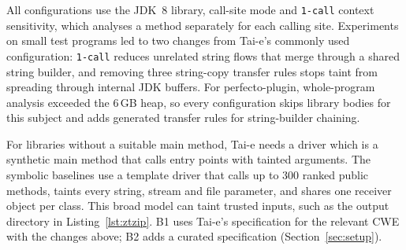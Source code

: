 \documentclass[sigconf]{acmart}
\begin{document}
All configurations use the JDK~8 library, call-site mode and \texttt{1-call} context sensitivity, which analyses a method separately for each calling site. Experiments on small test programs led to two changes from Tai-e's commonly used configuration: \texttt{1-call} reduces unrelated string flows that merge through a shared string builder, and removing three string-copy transfer rules stops taint from spreading through internal JDK buffers. For perfecto-plugin, whole-program analysis exceeded the 6\,GB heap, so every configuration skips library bodies for this subject and adds generated transfer rules for string-builder chaining.

For libraries without a suitable main method, Tai-e needs a driver which is a synthetic main method that calls entry points with tainted arguments. The symbolic baselines use a template driver that calls up to 300 ranked public methods, taints every string, stream and file parameter, and shares one receiver object per class. This broad model can taint trusted inputs, such as the output directory in Listing~\ref{lst:ztzip}. B1 uses Tai-e's specification for the relevant CWE with the changes above; B2 adds a curated specification (Section~\ref{sec:setup}).
\end{document}

